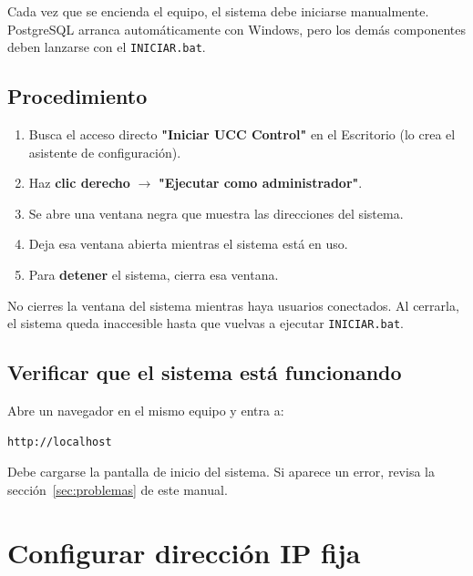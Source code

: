 \documentclass[12pt, a4paper]{article}
\begin{document}
Cada vez que se encienda el equipo, el sistema debe iniciarse
manualmente. PostgreSQL arranca automáticamente con Windows, pero
los demás componentes deben lanzarse con el \texttt{INICIAR.bat}.

\subsection{Procedimiento}

\begin{enumerate}
  \item Busca el acceso directo \textbf{"Iniciar UCC Control"} en el
        Escritorio (lo crea el asistente de configuración).
  \item Haz \textbf{clic derecho} $\rightarrow$ \textbf{"Ejecutar como administrador"}.
  \item Se abre una ventana negra que muestra las direcciones del sistema.
  \item Deja esa ventana abierta mientras el sistema está en uso.
  \item Para \textbf{detener} el sistema, cierra esa ventana.
\end{enumerate}

\begin{importante}
  No cierres la ventana del sistema mientras haya usuarios conectados.
  Al cerrarla, el sistema queda inaccesible hasta que vuelvas a ejecutar
  \texttt{INICIAR.bat}.
\end{importante}

\subsection{Verificar que el sistema está funcionando}

Abre un navegador en el mismo equipo y entra a:

\begin{lstlisting}
http://localhost
\end{lstlisting}

Debe cargarse la pantalla de inicio del sistema. Si aparece un error,
revisa la sección~\ref{sec:problemas} de este manual.

\section{Configurar dirección IP fija}
\label{sec:ipfija}
\end{document}
